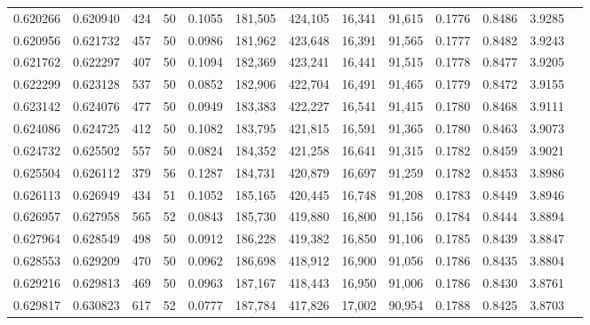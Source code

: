 \begin{tabular}{rrrrrrrrrrrrr}
0.620266 & 0.620940 &   424 &  50 &                                     0.1055 & 181,505 & 424,105 &  16,341 &  91,615 & 0.1776 & 0.8486 & 3.9285 \\
0.620956 & 0.621732 &   457 &  50 &                                     0.0986 & 181,962 & 423,648 &  16,391 &  91,565 & 0.1777 & 0.8482 & 3.9243 \\
0.621762 & 0.622297 &   407 &  50 &                                     0.1094 & 182,369 & 423,241 &  16,441 &  91,515 & 0.1778 & 0.8477 & 3.9205 \\
0.622299 & 0.623128 &   537 &  50 &                                     0.0852 & 182,906 & 422,704 &  16,491 &  91,465 & 0.1779 & 0.8472 & 3.9155 \\
0.623142 & 0.624076 &   477 &  50 &                                     0.0949 & 183,383 & 422,227 &  16,541 &  91,415 & 0.1780 & 0.8468 & 3.9111 \\
0.624086 & 0.624725 &   412 &  50 &                                     0.1082 & 183,795 & 421,815 &  16,591 &  91,365 & 0.1780 & 0.8463 & 3.9073 \\
0.624732 & 0.625502 &   557 &  50 &                                     0.0824 & 184,352 & 421,258 &  16,641 &  91,315 & 0.1782 & 0.8459 & 3.9021 \\
0.625504 & 0.626112 &   379 &  56 &                                     0.1287 & 184,731 & 420,879 &  16,697 &  91,259 & 0.1782 & 0.8453 & 3.8986 \\
0.626113 & 0.626949 &   434 &  51 &                                     0.1052 & 185,165 & 420,445 &  16,748 &  91,208 & 0.1783 & 0.8449 & 3.8946 \\
0.626957 & 0.627958 &   565 &  52 &                                     0.0843 & 185,730 & 419,880 &  16,800 &  91,156 & 0.1784 & 0.8444 & 3.8894 \\
0.627964 & 0.628549 &   498 &  50 &                                     0.0912 & 186,228 & 419,382 &  16,850 &  91,106 & 0.1785 & 0.8439 & 3.8847 \\
0.628553 & 0.629209 &   470 &  50 &                                     0.0962 & 186,698 & 418,912 &  16,900 &  91,056 & 0.1786 & 0.8435 & 3.8804 \\
0.629216 & 0.629813 &   469 &  50 &                                     0.0963 & 187,167 & 418,443 &  16,950 &  91,006 & 0.1786 & 0.8430 & 3.8761 \\
0.629817 & 0.630823 &   617 &  52 &                                     0.0777 & 187,784 & 417,826 &  17,002 &  90,954 & 0.1788 & 0.8425 & 3.8703 \\

\end{tabular}
